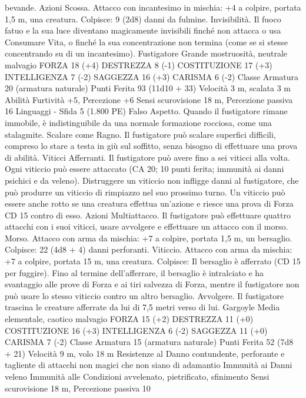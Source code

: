 \begin{multicols}{2}
bevande.
Azioni
Scossa. Attacco con incantesimo in mischia: +4 a colpire, portata
1,5 m, una creatura.
Colpisce: 9 (2d8) danni da fulmine.
Invisibilità. Il fuoco fatuo e la sua luce diventano magicamente
invisibili finché non attacca o usa Consumare Vita, o finché la
sua concentrazione non termina (come se si stesse concentrando
su di un incantesimo).
Fustigatore
Grande mostruosità, neutrale malvagio
FORZA 18 (+4)
DESTREZZA 8 (-1)
COSTITUZIONE 17 (+3)
INTELLIGENZA 7 (-2)
SAGGEZZA 16 (+3)
CARISMA 6 (-2)
Classe Armatura 20 (armatura naturale)
Punti Ferita 93 (11d10 + 33)
Velocità 3 m, scalata 3 m
Abilità Furtività +5, Percezione +6
Sensi scurovisione 18 m, Percezione passiva 16
Linguaggi -
Sfida 5 (1.800 PE)
Falso Aspetto. Quando il fustigatore rimane immobile, è
indistinguibile da una normale formazione rocciosa, come una
stalagmite.
Scalare come Ragno. Il fustigatore può scalare superfici difficili,
compreso lo stare a testa in giù sul soffitto, senza bisogno di
effettuare una prova di abilità.
Viticci Afferranti. Il fustigatore può avere fino a sei viticci alla
volta. Ogni viticcio può essere attaccato (CA 20; 10 punti ferita;
immunità ai danni psichici e da veleno). Distruggere un viticcio
non infligge danni al fustigatore, che può produrre un viticcio di
rimpiazzo nel suo prossimo turno. Un viticcio può essere anche
rotto se una creatura effettua un’azione e riesce una prova di
Forza CD 15 contro di esso.
Azioni
Multiattacco. Il fustigatore può effettuare quattro attacchi con i
suoi viticci, usare avvolgere e effettuare un attacco con il morso.
Morso. Attacco con arma da mischia: +7 a colpire, portata 1,5
m, un bersaglio.
Colpisce: 22 (4d8 + 4) danni perforanti.
Viticcio. Attacco con arma da mischia: +7 a colpire, portata 15
m, una creatura.
Colpisce: Il bersaglio è afferrato (CD 15 per fuggire). Fino al
termine dell’afferrare, il bersaglio è intralciato e ha svantaggio
alle prove di Forza e ai tiri salvezza di Forza, mentre il
fustigatore non può usare lo stesso viticcio contro un altro
bersaglio.
Avvolgere. Il fustigatore trascina le creature afferrate da lui di 7,5
metri verso di lui.
Gargoyle
Media elementale, caotico malvagio
FORZA 15 (+2)
DESTREZZA 11 (+0)
COSTITUZIONE 16 (+3)
INTELLIGENZA 6 (-2)
SAGGEZZA 11 (+0)
CARISMA 7 (-2)
Classe Armatura 15 (armatura naturale)
Punti Ferita 52 (7d8 + 21)
Velocità 9 m, volo 18 m
Resistenze al Danno contundente, perforante e tagliente di
attacchi non magici che non siano di adamantio
Immunità ai Danni veleno
Immunità alle Condizioni avvelenato, pietrificato, sfinimento
Sensi scurovisione 18 m, Percezione passiva 10

\end{multicols}
